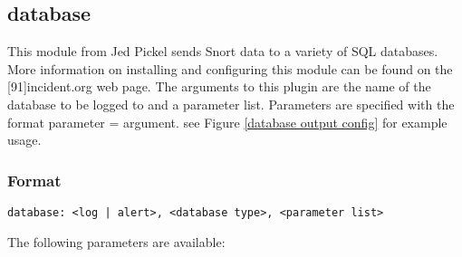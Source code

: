 \documentclass[english]{report}
\begin{document}
\subsection{database \label{database section}}

This module from Jed Pickel sends Snort data to a variety of SQL databases.
More information on installing and configuring this module can be
found on the {[}91{]}incident.org web page. The arguments to this
plugin are the name of the database to be logged to and a parameter
list. Parameters are specified with the format parameter = argument.
see Figure \ref{database output config} for example usage.


\subsubsection{Format}

\begin{verbatim}
database: <log | alert>, <database type>, <parameter list>
\end{verbatim}
The following parameters are available:
\end{document}
